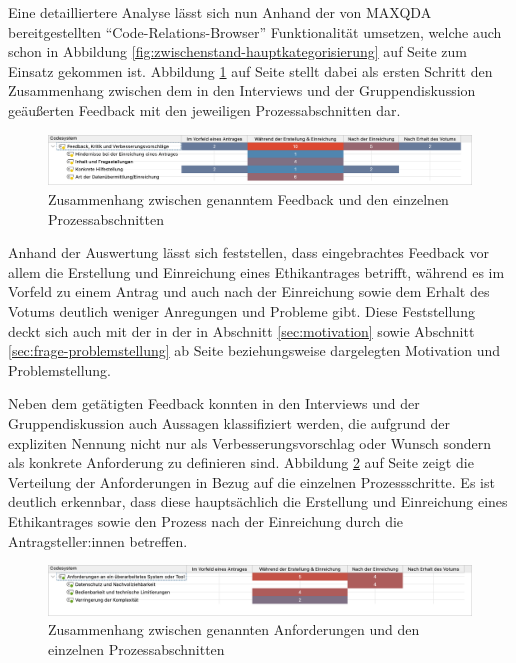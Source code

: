 \documentclass[a4paper,12pt,twoside]{scrreprt}
\begin{document}
\medskip

Eine detailliertere Analyse lässt sich nun Anhand der von MAXQDA bereitgestellten \enquote{Code-Relations-Browser} Funktionalität umsetzen, welche auch schon in Abbildung \ref{fig:zwischenstand-hauptkategorisierung} auf Seite \pageref{fig:zwischenstand-hauptkategorisierung} zum Einsatz gekommen ist. Abbildung \ref{fig:feedback-x-prozess} auf Seite \pageref{fig:feedback-x-prozess} stellt dabei als ersten Schritt den Zusammenhang zwischen dem in den Interviews und der Gruppendiskussion geäußerten Feedback mit den jeweiligen Prozessabschnitten dar.

\begin{figure}[ht]
    \centering
    \includegraphics[width=\linewidth]{thesis/images/Luidold_Feedback-Prozess.png}
    \caption{Zusammenhang zwischen genanntem Feedback und den einzelnen Prozessabschnitten}
    \label{fig:feedback-x-prozess}
\end{figure}

\clearpage

Anhand der Auswertung lässt sich feststellen, dass eingebrachtes Feedback vor allem die Erstellung und Einreichung eines Ethikantrages betrifft, während es im Vorfeld zu einem Antrag und auch nach der Einreichung sowie dem Erhalt des Votums deutlich weniger Anregungen und Probleme gibt. Diese Feststellung deckt sich auch mit der in der in Abschnitt \ref{sec:motivation} sowie Abschnitt \ref{sec:frage-problemstellung} ab Seite \pageref{sec:motivation} beziehungsweise \pageref{sec:frage-problemstellung} dargelegten Motivation und Problemstellung.

\medskip

Neben dem getätigten Feedback konnten in den Interviews und der Gruppendiskussion auch Aussagen klassifiziert werden, die aufgrund der expliziten Nennung nicht nur als Verbesserungsvorschlag oder Wunsch sondern als konkrete Anforderung zu definieren sind. Abbildung \ref{fig:anforderungen-x-prozess} auf Seite \pageref{fig:anforderungen-x-prozess} zeigt die Verteilung der Anforderungen in Bezug auf die einzelnen Prozessschritte. Es ist deutlich erkennbar, dass diese hauptsächlich die Erstellung und Einreichung eines Ethikantrages sowie den Prozess nach der Einreichung durch die Antragsteller:innen betreffen.

\begin{figure}[ht]
    \centering
    \includegraphics[width=\linewidth]{thesis/images/Luidold_Anforderungen-Prozess.png}
    \caption{Zusammenhang zwischen genannten Anforderungen und den einzelnen Prozessabschnitten}
    \label{fig:anforderungen-x-prozess}
\end{figure}
\end{document}

